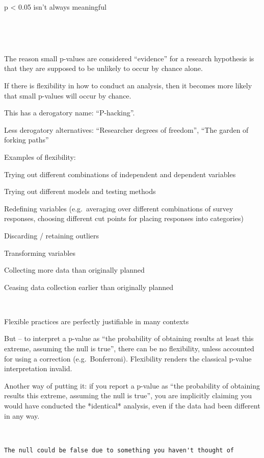\documentclass[
  letterpaper,
  DIV=11,
  numbers=noendperiod]{scrreprt}
\begin{document}
p \textless{} 0.05 isn't always meaningful

~

~

The reason small p-values are considered ``evidence'' for a research
hypothesis is that they are supposed to be unlikely to occur by chance
alone.

If there is flexibility in how to conduct an analysis, then it becomes
more likely that small p-values will occur by chance.

This has a derogatory name: ``P-hacking''. 

Less derogatory alternatives: ``Researcher degrees of freedom'', ``The
garden of forking paths''

Examples of flexibility: 

Trying out different combinations of independent and dependent variables

Trying out different models and testing methods

Redefining variables (e.g.~averaging over different combinations of
survey responses, choosing different cut points for placing responses
into categories)

Discarding / retaining outliers

Transforming variables

Collecting more data than originally planned

Ceasing data collection earlier than originally planned

~

Flexible practices are perfectly justifiable in many contexts

But -- to interpret a p-value as ``the probability of obtaining results
at least this extreme, assuming the null is true'', there can be no
flexibility, unless accounted for using a correction (e.g.~Bonferroni).
Flexibility renders the classical p-value interpretation invalid.

Another way of putting it: if you report a p-value as ``the probability
of obtaining results this extreme, assuming the null is true'', you are
implicitly claiming you would have conducted the *identical* analysis,
even if the data had been different in any way.

~

\begin{verbatim}
The null could be false due to something you haven't thought of
\end{verbatim}

~
\end{document}
